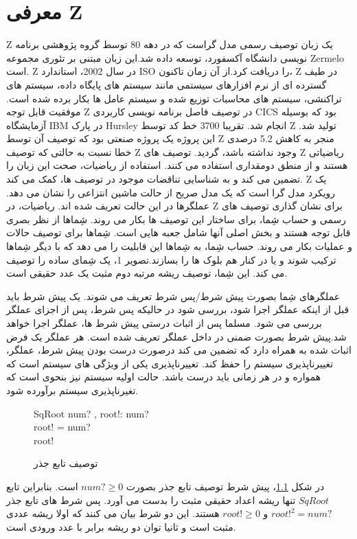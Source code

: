 \chapter{معرفی Z}\label{chapter2}
\paragraphfootnotes
Z یک زبان توصیف رسمی مدل گراست که در دهه 80 توسط گروه پژوهشی برنامه نویسی دانشگاه آکسفورد، توسعه داده شد.این زبان مبتنی بر تئوری مجموعه Zermelo است. Z در سال 2002، استاندارد ISO را دریافت کرد.از آن زمان تاکنون، Z در طیف گسترده ای از نرم افزارهای سیستمی مانند سیستم های پایگاه داده، سیستم های تراکنشی، سیستم های محاسبات توزیع شده و سیستم عامل ها بکار برده شده است. موفقیت قابل توجه Z در توصیف فاصل برنامه نویسی کاربردی CICS بود که بوسیله آزمایشگاه IBM در پارک Hursley انجام شد. تقریبا 3700 خط کد توسط Z تولید شد. این پروژه یک پروژه صنعتی بود که توصیف آن توسط Z منجر به کاهش 5.2 درصدی خطا نسبت به حالتی که توصیف Z وجود نداشته باشد، گردید. توصیف های Z ریاضیاتی هستند و از منطق دومقداری استفاده می کنند. استفاده از ریاضیات، صحت این زبان را تضمین می کند و به شناسایی تناقضات موجود در توصیف ها، کمک می کند.
Z یک رویکرد مدل گرا است که یک مدل صریح از حالت ماشین انتزاعی را نشان می دهد. عملگرها در این حالت تعریف شده اند. ریاضیات، در Z برای نشان گذاری توصیف های رسمی و حساب شِما، برای ساختار این توصیف ها بکار می روند. شِماها از نظر بصری قابل توجه هستند و بخش اصلی آنها شامل جعبه هایی است. شِماها برای توصیف حالات و عملیات بکار می روند. حساب شِما، به شِماها این قابلیت را می دهد که با دیگر شِماها ترکیب شوند و یا در کنار هم بلوک ها را بسازند.تصویر 1، یک شِمای ساده را توصیف می کند. این شِما، توصیف ریشه مرتبه دوم مثبت یک عدد حقیقی است. 

عملگرهای شِما بصورت پیش شرط/پس شرط تعریف می شوند. یک پیش شرط باید قبل از اینکه عملگر اجرا شود، بررسی شود در حالیکه پس شرط، پس از اجزای عملگر بررسی می شود. مسلما پس از اثبات درستی پیش شرط ها، عملگر اجرا خواهد شد.پیش شرط بصورت ضمنی در داخل عملگر تعریف شده است. هر عملگر یک فرض اثبات شده به همراه دارد که تضمین می کند درصورت درست بودن پیش شرط، عملگر، تغییرناپذیری سیستم را حفظ کند. تغییرناپذیری یکی از ویژگی های سیستم است که همواره و در هر زمانی باید درست باشد. حالت اولیه سیستم نیز بنحوی است که تغیرناپذیری سیستم برآورده شود.
\begin{figure}
\centering
\begin{schema}{SqRoot}
num? , root!: 
\where
num? \\
root!  = num?\\
root! 
\end{schema}
\caption{توصیف تابع جذر}
\label{SqRoor}
\end{figure}
در شکل \ref{SqRoor}، پیش شرط توصیف تابع جذر بصورت 
$num? \ge 0$
است. بنابراین تابع $SqRoot$ تنها ریشه اعداد حقیقی مثبت را بدست می آورد. پس شرط های تابع جذر 
 $root!^2 = num?$ و $ root! \ge 0$ 
  هستند. این دو شرط بیان می کنند که اولا ریشه عددی مثبت است و ثانیا توان دو ریشه برابر با عدد ورودی است.
  
